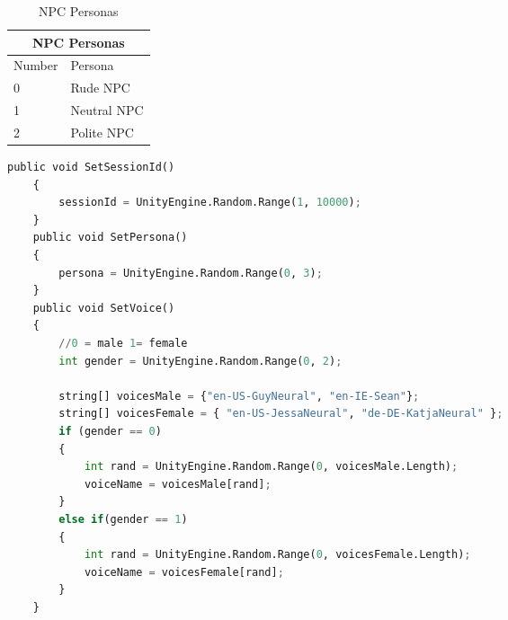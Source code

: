 \begin{table}[!ht]
    \centering
    
    \caption{NPC Personas \newline}
    \label{tab:my_label}
\begin{tabular}{ |p{3cm}|p{5cm}|  }
\hline
\multicolumn{2}{|c|}{NPC Personas} \\
\hline
Number & Persona \\
\hline
0 & Rude NPC \\
\hline
1 & Neutral NPC \\
\hline
2 & Polite NPC \\
\hline
\end{tabular}

\end{table}
\newpage

\begin{lstlisting}[caption={Random NPC persona generation.},label={lst:npcs}, language=python]
    public void SetSessionId()
    {
        sessionId = UnityEngine.Random.Range(1, 10000);
    }
    public void SetPersona()
    {
        persona = UnityEngine.Random.Range(0, 3);
    }
    public void SetVoice()
    {
        //0 = male 1= female
        int gender = UnityEngine.Random.Range(0, 2);
        
        string[] voicesMale = {"en-US-GuyNeural", "en-IE-Sean"};
        string[] voicesFemale = { "en-US-JessaNeural", "de-DE-KatjaNeural" };
        if (gender == 0)
        {
            int rand = UnityEngine.Random.Range(0, voicesMale.Length);
            voiceName = voicesMale[rand];
        }
        else if(gender == 1)
        {
            int rand = UnityEngine.Random.Range(0, voicesFemale.Length);
            voiceName = voicesFemale[rand];
        }
    }
\end{lstlisting}

